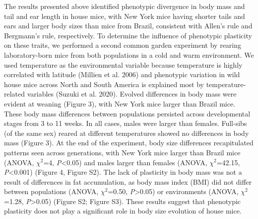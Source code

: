 \documentclass[]{article}
\begin{document}
The results presented above identified phenotypic divergence in body
mass and tail and ear length in house mice, with New York mice having
shorter tails and ears and larger body sizes than mice from Brazil,
consistent with Allen's rule and Bergmann's rule, respectively. To
determine the influence of phenotypic plasticity on these traits, we
performed a second common garden experiment by rearing laboratory-born
mice from both populations in a cold and warm environment. We used
temperature as the environmental variable because temperature is highly
correlated with latitude (Millien et al. 2006) and phenotypic variation
in wild house mice across North and South America is explained most by
temperature-related variables (Suzuki et al. 2020). Evolved differences
in body mass were evident at weaning (Figure 3), with New York mice
larger than Brazil mice. These body mass differences between populations
persisted across developmental stages from 3 to 11 weeks. In all cases,
males were larger than females. Full-sibs (of the same sex) reared at
different temperatures showed no differences in body mass (Figure 3). At
the end of the experiment, body size differences recapitulated patterns
seen across generations, with New York mice larger than Brazil mice
(ANOVA, \(\chi^2\)=4, \emph{P}\textless{}0.05) and males larger than
females (ANOVA, \(\chi^2\)=42.15, \emph{P}\textless{}0.001) (Figure 4,
Figure S2). The lack of plasticity in body mass was not a result of
differences in fat accumulation, as body mass index (BMI) did not differ
between populations (ANOVA, \(\chi^2\)=0.50, \emph{P}\textgreater{}0.05)
or environments (ANOVA, \(\chi^2\)=1.28, \emph{P}\textgreater{}0.05)
(Figure S2; Figure S3). These results suggest that phenotypic plasticity
does not play a significant role in body size evolution of house mice.
\end{document}
